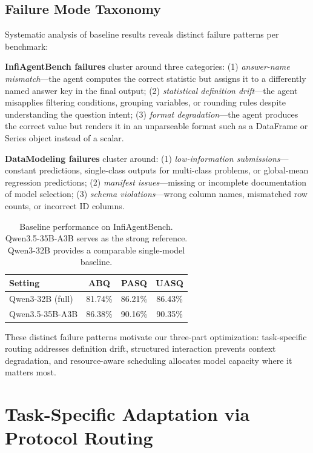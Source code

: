 \documentclass[letterpaper]{article} %
\begin{document}
\subsection{Failure Mode Taxonomy}

Systematic analysis of baseline results reveals distinct failure patterns per benchmark:

\textbf{InfiAgentBench failures} cluster around three categories: (1) \textit{answer-name mismatch}---the agent computes the correct statistic but assigns it to a differently named answer key in the final output; (2) \textit{statistical definition drift}---the agent misapplies filtering conditions, grouping variables, or rounding rules despite understanding the question intent; (3) \textit{format degradation}---the agent produces the correct value but renders it in an unparseable format such as a DataFrame or Series object instead of a scalar.

\textbf{DataModeling failures} cluster around: (1) \textit{low-information submissions}---constant predictions, single-class outputs for multi-class problems, or global-mean regression predictions; (2) \textit{manifest issues}---missing or incomplete documentation of model selection; (3) \textit{schema violations}---wrong column names, mismatched row counts, or incorrect ID columns.

\begin{table}[t]
\centering
\caption{Baseline performance on InfiAgentBench. Qwen3.5-35B-A3B serves as the strong reference. Qwen3-32B provides a comparable single-model baseline.}
\label{tab:baseline}
\begin{tabular}{lccc}
\toprule
\textbf{Setting} & \textbf{ABQ} & \textbf{PASQ} & \textbf{UASQ} \\
\midrule
Qwen3-32B (full) & 81.74\% & 86.21\% & 86.43\% \\
Qwen3.5-35B-A3B & 86.38\% & 90.16\% & 90.35\% \\
\bottomrule
\end{tabular}
\end{table}

These distinct failure patterns motivate our three-part optimization: task-specific routing addresses definition drift, structured interaction prevents context degradation, and resource-aware scheduling allocates model capacity where it matters most.

\section{Task-Specific Adaptation via Protocol Routing}
\label{sec:task}
\end{document}
